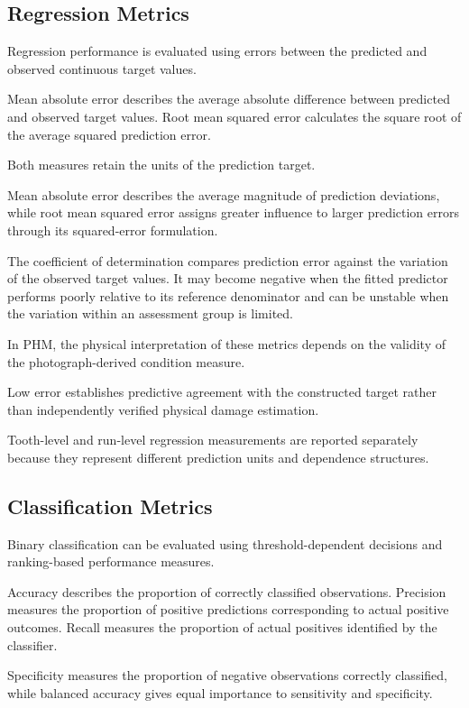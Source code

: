 \subsection{Regression Metrics}

Regression performance is evaluated using errors between the predicted and observed continuous target values.

Mean absolute error describes the average absolute difference between predicted and observed target values. Root mean squared error calculates the square root of the average squared prediction error.

Both measures retain the units of the prediction target.

Mean absolute error describes the average magnitude of prediction deviations, while root mean squared error assigns greater influence to larger prediction errors through its squared-error formulation.

The coefficient of determination compares prediction error against the variation of the observed target values. It may become negative when the fitted predictor performs poorly relative to its reference denominator and can be unstable when the variation within an assessment group is limited.

In PHM, the physical interpretation of these metrics depends on the validity of the photograph-derived condition measure.

Low error establishes predictive agreement with the constructed target rather than independently verified physical damage estimation.

Tooth-level and run-level regression measurements are reported separately because they represent different prediction units and dependence structures.

\subsection{Classification Metrics}

Binary classification can be evaluated using threshold-dependent decisions and ranking-based performance measures.

Accuracy describes the proportion of correctly classified observations. Precision measures the proportion of positive predictions corresponding to actual positive outcomes. Recall measures the proportion of actual positives identified by the classifier.

Specificity measures the proportion of negative observations correctly classified, while balanced accuracy gives equal importance to sensitivity and specificity.


